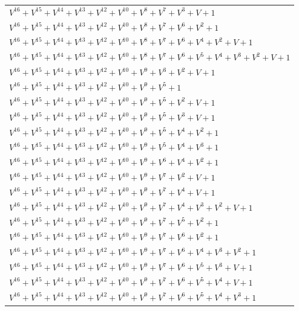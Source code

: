 \documentclass[12pt]{article}
\begin{document}
\begin{adjustwidth}{-4cm}{}
\begin{center}
\begin{longtable}{|l|}
$V^{16}  +V^{15}  +V^{14}  +V^{13}  +V^{12}  +V^{10}  +V^{8}  +V^{7}  +V^{3}  + V + 1$ \\
$V^{16}  +V^{15}  +V^{14}  +V^{13}  +V^{12}  +V^{10}  +V^{8}  +V^{7}  +V^{6}  +V^{2}  + 1$ \\
$V^{16}  +V^{15}  +V^{14}  +V^{13}  +V^{12}  +V^{10}  +V^{8}  +V^{7}  +V^{6}  +V^{4}  +V^{2}  + V + 1$ \\
$V^{16}  +V^{15}  +V^{14}  +V^{13}  +V^{12}  +V^{10}  +V^{8}  +V^{7}  +V^{6}  +V^{5}  +V^{4}  +V^{3}  +V^{2}  + V + 1$ \\
$V^{16}  +V^{15}  +V^{14}  +V^{13}  +V^{12}  +V^{10}  +V^{9}  +V^{3}  +V^{2}  + V + 1$ \\
$V^{16}  +V^{15}  +V^{14}  +V^{13}  +V^{12}  +V^{10}  +V^{9}  +V^{5}  + 1$ \\
$V^{16}  +V^{15}  +V^{14}  +V^{13}  +V^{12}  +V^{10}  +V^{9}  +V^{5}  +V^{2}  + V + 1$ \\
$V^{16}  +V^{15}  +V^{14}  +V^{13}  +V^{12}  +V^{10}  +V^{9}  +V^{5}  +V^{3}  + V + 1$ \\
$V^{16}  +V^{15}  +V^{14}  +V^{13}  +V^{12}  +V^{10}  +V^{9}  +V^{5}  +V^{4}  +V^{2}  + 1$ \\
$V^{16}  +V^{15}  +V^{14}  +V^{13}  +V^{12}  +V^{10}  +V^{9}  +V^{5}  +V^{4}  +V^{3}  + 1$ \\
$V^{16}  +V^{15}  +V^{14}  +V^{13}  +V^{12}  +V^{10}  +V^{9}  +V^{6}  +V^{4}  +V^{2}  + 1$ \\
$V^{16}  +V^{15}  +V^{14}  +V^{13}  +V^{12}  +V^{10}  +V^{9}  +V^{7}  +V^{2}  + V + 1$ \\
$V^{16}  +V^{15}  +V^{14}  +V^{13}  +V^{12}  +V^{10}  +V^{9}  +V^{7}  +V^{4}  + V + 1$ \\
$V^{16}  +V^{15}  +V^{14}  +V^{13}  +V^{12}  +V^{10}  +V^{9}  +V^{7}  +V^{4}  +V^{3}  +V^{2}  + V + 1$ \\
$V^{16}  +V^{15}  +V^{14}  +V^{13}  +V^{12}  +V^{10}  +V^{9}  +V^{7}  +V^{5}  +V^{2}  + 1$ \\
$V^{16}  +V^{15}  +V^{14}  +V^{13}  +V^{12}  +V^{10}  +V^{9}  +V^{7}  +V^{6}  +V^{2}  + 1$ \\
$V^{16}  +V^{15}  +V^{14}  +V^{13}  +V^{12}  +V^{10}  +V^{9}  +V^{7}  +V^{6}  +V^{4}  +V^{3}  +V^{2}  + 1$ \\
$V^{16}  +V^{15}  +V^{14}  +V^{13}  +V^{12}  +V^{10}  +V^{9}  +V^{7}  +V^{6}  +V^{5}  +V^{3}  + V + 1$ \\
$V^{16}  +V^{15}  +V^{14}  +V^{13}  +V^{12}  +V^{10}  +V^{9}  +V^{7}  +V^{6}  +V^{5}  +V^{4}  + V + 1$ \\
$V^{16}  +V^{15}  +V^{14}  +V^{13}  +V^{12}  +V^{10}  +V^{9}  +V^{7}  +V^{6}  +V^{5}  +V^{4}  +V^{3}  + 1$ \\

\end{longtable}
\end{center}
\end{adjustwidth}
\end{document}
